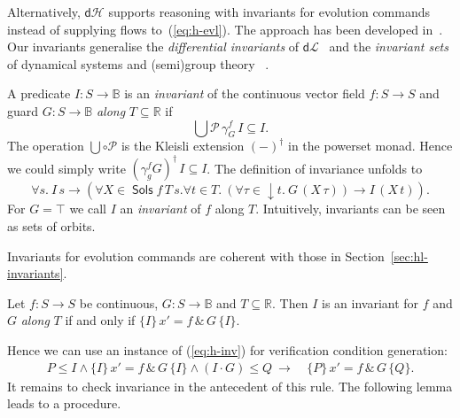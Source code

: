 \documentclass[envcountsame]{llncs}
\newcommand{\dL}{\mathsf{d}\mathcal{L}}
\newcommand{\dH}{\mathsf{d}\mathcal{H}}
\newcommand{\Pow}{\mathcal{P}}
\newcommand{\reals}{\mathbb{R}}
\newcommand{\bools}{\mathbb{B}}
\newcommand{\Sols}{\mathop{\mathsf{Sols}}}
\begin{document}
Alternatively, $\dH$ supports reasoning with invariants for evolution
commands instead of supplying flows to~(\ref{eq:h-evl}).  The approach
has been developed in~\cite{MuniveS19}. Our invariants generalise the
\emph{differential invariants} of $\dL$~\cite{Platzer18} and the
\emph{invariant sets} of dynamical systems and (semi)group
theory~\cite{Teschl12} .

A predicate $I:S\to\bools$ is an \emph{invariant} of the continuous
vector field $f:S\to S$ and guard $G:S\to\bools$ \emph{along}
$T\subseteq \reals$ if
\begin{equation*}
\bigcup \Pow\, \gamma^f_G\, I\subseteq  I.
\end{equation*}
The operation $\bigcup\circ\Pow$ is the Kleisli extension $(-)^\dagger$
in the powerset monad. Hence we could simply write
$(\gamma^f_gG)^\dagger\, I \subseteq I$. The definition of invariance
unfolds to
\begin{equation*}
  \forall s.\ I\, s \to (\forall X\in\Sols f\, T\, s.\forall t\in T.\ (\forall \tau\in {\downarrow}t.\ G\, (X\, \tau)) \to I\, (X\, t)).
\end{equation*}
For $G=\top$ we call $I$ an \emph{invariant} of $f$ along $T$.
Intuitively, invariants can be seen as sets of orbits.

Invariants for evolution commands are coherent with those in Section~\ref{sec:hl-invariants}.
\begin{proposition}\label{P:inv-prop}
  Let $f:S\to S$ be continuous, $G:S\to\bools$ and
  $T\subseteq \reals$. Then $I$ is an invariant for $f$ and $G$ \emph{along} $T$ if and only if
$ \{I\}\, x' = f\, \&\, G\, \{I\}$.
\end{proposition}
Hence we can use an instance of (\ref{eq:h-inv}) for verification condition generation:
\begin{align}
  P\le I \land \{I\}\, x' = f\, \&\, G\, \{I\}\land (I\cdot G)\le Q\ \rightarrow\
  &\{P\}\, x' = f\, \&\, G\, \{Q\}.\label{eq:h-invg}\tag{h-invg}
\end{align}
It remains to check invariance in the antecedent of this rule. The
following lemma leads to a procedure.
\end{document}
